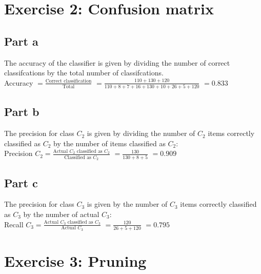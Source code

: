 \documentclass[a4paper, 10pt]{article}
\begin{document}
\section{Exercise 2: Confusion matrix}
\subsection{Part a}
The accuracy of the classifier is given by dividing the number of correct classifcations
by the total number of classifcations.
\\
Accuracy $=\frac{\text{Correct classification}}{\text{Total}}$
         $=\frac{110+130+120}{110+8+7+16+130+10+26+5+120}$
         $= 0.833$
          
\subsection{Part b}

The precision for class $C_2$ is given by dividing the number of $C_2$ items correctly classified 
as $C_2$ by the number of items classified as $C_2$:
\\
Precision $C_2 =\frac{\text{Actual }C_2\text{ classified as }C_2 }{\text{Classified as }C_2}$
             $=\frac{130}{130+8+5}$ 
             $=0.909$

\subsection{Part c}

The precision for class $C_3$ is given by the number of $C_3$ items correctly classified 
as $C_3$ by the number of actual $C_3$:
\\
Recall $C_3 =\frac{\text{Actual }C_3\text{ classified as }C_3 }{\text{Actual }C_3}$
          $=\frac{120}{26+5+120}$
          $=0.795$

\section{Exercise 3: Pruning}
\end{document}
